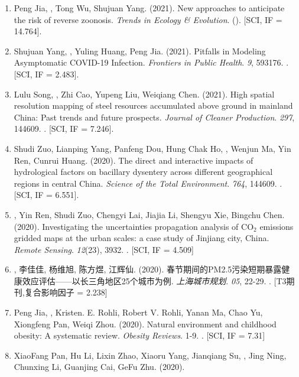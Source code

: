 \begin{enumerate}
\item
    Peng Jia, \Shaoqing, Tong Wu, Shujuan Yang. (2021).
    New approaches to anticipate the risk of reverse zoonosis.
    \textit{Trends in Ecology \& Evolution}. ({}). [SCI, IF = 14.764].
\item
    Shujuan Yang, \Shaoqing, Yuling Huang, Peng Jia. (2021).
    Pitfalls in Modeling Asymptomatic COVID-19 Infection.
    \textit{Frontiers in Public Health}. \textit{9}, 593176.
    . [SCI, IF = 2.483].
\item
    Lulu Song, \Shaoqing, Zhi Cao, Yupeng Liu, Weiqiang Chen. (2021).
    High spatial resolution mapping of steel resources accumulated above ground in mainland China: Past trends and future prospects.
    \textit{Journal of Cleaner Production}. \textit{297}, 144609.
    . [SCI, IF = 7.246].
\item
    Shudi Zuo, Lianping Yang, Panfeng Dou, Hung Chak Ho, \Shaoqing, Wenjun Ma, Yin Ren, Cunrui Huang. (2020).
    The direct and interactive impacts of hydrological factors on bacillary dysentery across different geographical regions in central China.
    \textit{Science of the Total Environment}. \textit{764}, 144609.
    . [SCI, IF = 6.551].
\item
    \Shaoqing\CF, Yin Ren, Shudi Zuo, Chengyi Lai, Jiajia Li, Shengyu Xie, Bingchu Chen. (2020).
    Investigating the uncertainties propagation analysis of CO$_2$ emissions gridded maps at the urban scales: a case study of Jinjiang city, China. 
    \textit{Remote Sensing}. \textit{12}(23), 3932.
    . [SCI, IF = 4.509]
\item
    {}, 李佳佳, 杨维旭, 陈方煜, 江辉仙. (2020).
    春节期间的PM2.5污染短期暴露健康效应评估——以长三角地区25个城市为例.
    \textit{上海城市规划}. \textit{05}, 22-29.
    . [T3期刊,复合影响因子 = 2.238] 
\item
    Peng Jia, \Shaoqing, Kristen. E. Rohli, Robert V. Rohli, Yanan Ma, Chao Yu, Xiongfeng Pan, Weiqi Zhou. (2020).
    Natural environment and childhood obesity: A systematic review.
    \textit{Obesity Reviews}. 1-9.
    . [SCI, IF = 7.31]
\item
    XiaoFang Pan, Hu Li, Lixin Zhao, Xiaoru Yang, Jianqiang Su, \Shaoqing, Jing Ning, Chunxing Li, Guanjing Cai, GeFu Zhu. (2020).

\end{enumerate}
